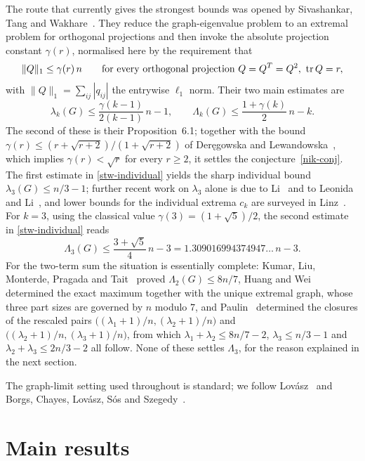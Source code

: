 The route that currently gives the strongest bounds was opened by Sivashankar,
Tang and Wakhare~\cite{STW}. They reduce the graph-eigenvalue problem to an
extremal problem for orthogonal projections and then invoke the absolute
projection constant $\gamma(r)$, normalised here by the requirement that
\begin{equation}\label{gamma-def}
 \|Q\|_1\le\gamma(r)\,n
 \qquad\text{for every orthogonal projection }Q=Q^T=Q^2,\ \operatorname{tr} Q=r,
\end{equation}
with $\|Q\|_1=\sum_{ij}|q_{ij}|$ the entrywise $\ell_1$ norm. Their two main
estimates are
\begin{equation}\label{stw-individual}
 \lambda_k(G)\le\frac{\gamma(k-1)}{2(k-1)}\,n-1,
 \qquad
 \Lambda_k(G)\le\frac{1+\gamma(k)}2\,n-k .
\end{equation}
The second of these is their Proposition~6.1; together with the bound
$\gamma(r)\le(r+\sqrt{r+2})/(1+\sqrt{r+2})$ of Der\k{e}gowska and
Lewandowska~\cite{DL}, which implies $\gamma(r)<\sqrt r$ for every $r\ge2$,
it settles the conjecture~\eqref{nik-conj}. The first estimate in
\eqref{stw-individual} yields the sharp individual bound
$\lambda_3(G)\le n/3-1$; further recent work on $\lambda_3$ alone is due to
Li~\cite{Li3} and to Leonida and Li~\cite{LeonidaLi}, and lower bounds for
the individual extrema $c_k$ are surveyed in Linz~\cite{Linz}. For $k=3$,
using the classical value $\gamma(3)=(1+\sqrt5)/2$, the second estimate in
\eqref{stw-individual} reads
\begin{equation}\label{stw-hist}
 \Lambda_3(G)\le\frac{3+\sqrt5}4\,n-3=1.309016994374947\ldots\,n-3 .
\end{equation}
For the two-term sum the situation is essentially complete: Kumar, Liu,
Monterde, Pragada and Tait~\cite{KLMPT} proved $\Lambda_2(G)\le8n/7$, Huang
and Wei~\cite{HW} determined the exact maximum together with the unique
extremal graph, whose three part sizes are governed by $n$ modulo $7$, and
Paulin~\cite{Paulin} determined the closures of the rescaled pairs
$\bigl((\lambda_1+1)/n,(\lambda_2+1)/n\bigr)$ and
$\bigl((\lambda_2+1)/n,(\lambda_3+1)/n\bigr)$, from which
$\lambda_1+\lambda_2\le8n/7-2$, $\lambda_3\le n/3-1$ and
$\lambda_2+\lambda_3\le2n/3-2$ all follow. None of these settles
$\Lambda_3$, for the reason explained in the next section.

The graph-limit setting used throughout is standard; we follow
Lov\'asz~\cite{LovaszBook} and Borgs, Chayes, Lov\'asz, S\'os and
Szegedy~\cite{BCLSV}.

\section{Main results}\label{sec-main-results}


